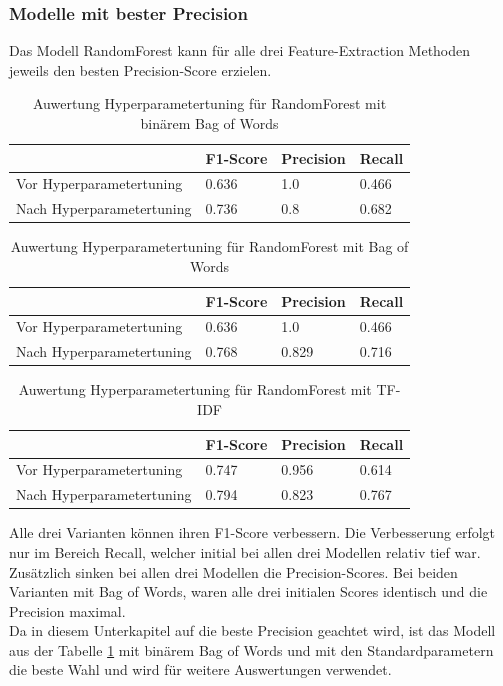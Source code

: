 \subsubsection{Modelle mit bester Precision}
Das Modell RandomForest kann für alle drei Feature-Extraction Methoden jeweils den besten Precision-Score erzielen.\\
\begin{table}[H]
	\caption{Auwertung Hyperparametertuning für RandomForest mit binärem Bag of Words}
	\centering
	\label{tab:bow-rf}
	\begin{tabular}{|l|l|l|l|}
		\hline
		& F1-Score & Precision & Recall\\
		\hline
		Vor Hyperparametertuning & 0.636 & 1.0 & 0.466 \\
		Nach Hyperparametertuning & 0.736 & 0.8 & 0.682 \\
		\hline
	\end{tabular}
\end{table}
\begin{table}[H]
	\caption{Auwertung Hyperparametertuning für RandomForest mit Bag of Words}
	\centering
	\begin{tabular}{|l|l|l|l|}
		\hline
		& F1-Score & Precision & Recall\\
		\hline
		Vor Hyperparametertuning & 0.636 & 1.0 & 0.466 \\
		Nach Hyperparametertuning & 0.768 & 0.829 & 0.716 \\
		\hline
	\end{tabular}
\end{table}
\begin{table}[H]
	\caption{Auwertung Hyperparametertuning für RandomForest mit TF-IDF}
	\centering
	\begin{tabular}{|l|l|l|l|}
		\hline
		& F1-Score & Precision & Recall\\
		\hline
		Vor Hyperparametertuning & 0.747 & 0.956 & 0.614 \\
		Nach Hyperparametertuning & 0.794 & 0.823 & 0.767 \\
		\hline
	\end{tabular}
\end{table}
Alle drei Varianten können ihren F1-Score verbessern.
Die Verbesserung erfolgt nur im Bereich Recall, welcher initial bei allen drei Modellen relativ tief war.
Zusätzlich sinken bei allen drei Modellen die Precision-Scores.
Bei beiden Varianten mit Bag of Words, waren alle drei initialen Scores identisch und die Precision maximal.\\
Da in diesem Unterkapitel auf die beste Precision geachtet wird, ist das Modell aus der Tabelle \cref{tab:bow-rf} mit binärem Bag of Words und mit den Standardparametern die beste Wahl und wird für weitere Auswertungen verwendet.
